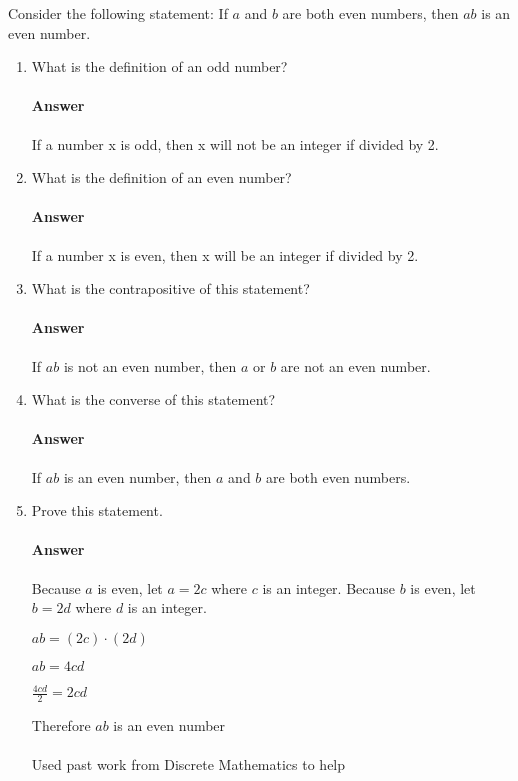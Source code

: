 \documentclass{article}
\begin{document}
\collab{}
Consider the following statement: If $a$ and $b$ are both even numbers, then $ab$ is
an even number.
\begin{enumerate}
      \item What is the definition of an odd number?
            
            \paragraph{Answer} If a number x is odd, then x will not be an integer if divided by 2.
            
      \item What is the definition of an even number?
            
            \paragraph{Answer} If a number x is even, then x will be an integer if divided by 2.
            
      \item What is the contrapositive of this statement?
            
            \paragraph{Answer} If $ab$ is not an even number, then $a$ or $b$ are not an even number.
            
      \item What is the converse of this statement?
            
            \paragraph{Answer} If $ab$ is an even number, then $a$ and $b$ are both even numbers.
            
      \item Prove this statement.
            
            \paragraph{Answer} Because $a$ is even, let $ a= 2c$ where $c$ is an integer.
            Because $b$ is even, let $ b= 2d$ where $d$ is an integer.
            
            $ab = (2c) \cdot (2d)$
            
            $ab = 4cd$
            
            $\frac{4cd}{2} = 2cd$
            
            Therefore $ab$ is an even number
            
            
            \paragraph{}
            Used past work from Discrete Mathematics to help
            
\end{enumerate}
\end{document}
